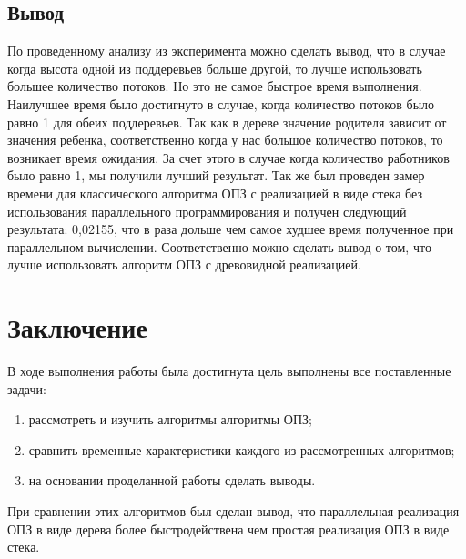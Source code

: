\documentclass[a4paper, 12pt]{article}
\begin{document}
	\subsection{Вывод}
	\hspace*{5mm} По проведенному анализу из  эксперимента можно сделать вывод, что в случае когда высота одной из поддеревьев больше другой, то лучше использовать большее количество потоков. Но это не самое быстрое время выполнения. Наилучшее время было достигнуто в случае, когда количество потоков было равно 1 для обеих поддеревьев. Так как в дереве значение родителя зависит от значения ребенка, соответственно когда у нас большое количество потоков, то возникает время ожидания. За счет этого в случае когда количество работников было равно 1, мы получили лучший результат. Так же был проведен замер времени для классического алгоритма ОПЗ с реализацией в виде стека без использования параллельного программирования и получен следующий результата: 0,02155, что в раза дольше чем самое худшее время полученное при параллельном вычислении. Соответственно можно сделать вывод о том, что лучше использовать алгоритм ОПЗ с древовидной реализацией.  
	\clearpage
	\newpage
	\section*{Заключение}
	\hspace*{5mm} В ходе выполнения работы была достигнута цель выполнены все поставленные задачи:
	\begin{enumerate}
		\item рассмотреть и изучить алгоритмы алгоритмы ОПЗ;
		\item сравнить временные характеристики каждого из рассмотренных алгоритмов;
		\item на основании проделанной работы сделать выводы.
	\end{enumerate}
	\hspace*{5mm}При сравнении этих алгоритмов был сделан вывод, что параллельная реализация ОПЗ в виде дерева более быстродействена чем простая реализация ОПЗ в виде стека.    
\clearpage
\newpage

\printbibliography
{}
\end{document}
